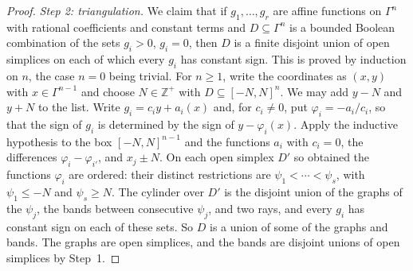 \documentclass[12pt]{amsart}
\theoremstyle{plain}
\theoremstyle{definition}
\theoremstyle{remark}
\numberwithin{equation}{section}
\theoremstyle{plain}
\newcommand{\Z}{\mathds{Z}}
\newcommand{\0}{\emptyset}
\newcommand{\sub}{\subseteq}
\begin{document}
\begin{proof}
\emph{Step 2: triangulation.} We claim that if $g_1, \ldots, g_r$ are affine functions on $\Gamma^n$ with rational coefficients and constant terms and $D \sub \Gamma^n$ is a bounded Boolean combination of the sets $g_i > 0$, $g_i = 0$, then $D$ is a finite disjoint union of open simplices on each of which every $g_i$ has constant sign. This is proved by induction on $n$, the case $n = 0$ being trivial. For $n \geq 1$, write the coordinates as $(x, y)$ with $x \in \Gamma^{n-1}$ and choose $N \in \Z^+$ with $D \sub [-N, N]^n$. We may add $y - N$ and $y + N$ to the list. Write $g_i = c_i y + a_i(x)$ and, for $c_i \neq 0$, put $\varphi_i = - a_i / c_i$, so that the sign of $g_i$ is determined by the sign of $y - \varphi_i(x)$. Apply the inductive hypothesis to the box $[-N, N]^{n-1}$ and the functions $a_i$ with $c_i = 0$, the differences $\varphi_i - \varphi_{i'}$, and $x_j \pm N$. On each open simplex $D'$ so obtained the functions $\varphi_i$ are ordered: their distinct restrictions are $\psi_1 < \cdots < \psi_s$, with $\psi_1 \leq -N$ and $\psi_s \geq N$. The cylinder over $D'$ is the disjoint union of the graphs of the $\psi_j$, the bands between consecutive $\psi_j$, and two rays, and every $g_i$ has constant sign on each of these sets. So $D$ is a union of some of the graphs and bands. The graphs are open simplices, and the bands are disjoint unions of open simplices by Step~1.


\end{proof}
\end{document}
